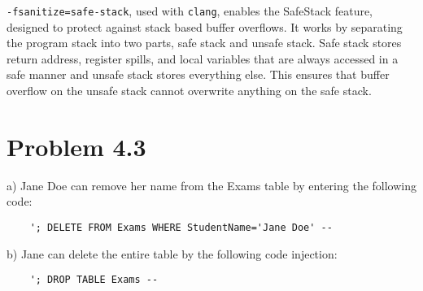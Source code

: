 \documentclass{article}
\begin{document}
\texttt{-fsanitize=safe-stack}, used with \texttt{clang}, enables the SafeStack feature, designed to protect against stack based buffer overflows. It works by separating the program stack into two parts, safe stack and unsafe stack. Safe stack stores return address, register spills, and local variables that are always accessed in a safe manner and unsafe stack stores everything else. This ensures that buffer overflow on the unsafe stack cannot overwrite anything on the safe stack.

\section{Problem 4.3}
a) Jane Doe can remove her name from the Exams table by entering the following code:
\begin{verbatim}
    '; DELETE FROM Exams WHERE StudentName='Jane Doe' --
\end{verbatim}

b) Jane can delete the entire table by the following code injection:

\begin{verbatim}
    '; DROP TABLE Exams --
\end{verbatim}
\end{document}
